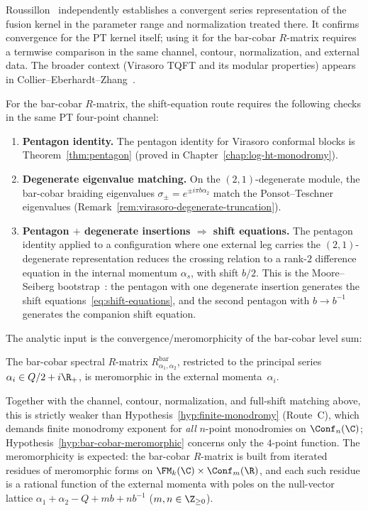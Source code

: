 Roussillon~\cite{Roussillon24} independently establishes a
convergent series representation of the fusion kernel in the parameter
range and normalization treated there. It confirms convergence for the
PT kernel itself; using it for the bar-cobar $R$-matrix requires a
termwise comparison in the same channel, contour, normalization, and
external data. The broader context (Virasoro TQFT and its modular
properties) appears in Collier--Eberhardt--Zhang~\cite{CEZ23}.

For the bar-cobar $R$-matrix, the shift-equation route requires the
following checks in the same PT four-point channel:
\begin{enumerate}[label=\textup{(\roman*)}]
\item \textbf{Pentagon identity.}
 The pentagon identity for Virasoro conformal blocks is
 Theorem~\ref{thm:pentagon} (proved in
 Chapter~\ref{chap:log-ht-monodromy}).

\item \textbf{Degenerate eigenvalue matching.}
 On the $(2,1)$-degenerate module, the bar-cobar braiding
 eigenvalues $\sigma_\pm = e^{\pm i\pi b\alpha_2}$ match the
 Ponsot--Teschner eigenvalues
 (Remark~\ref{rem:virasoro-degenerate-truncation}).

\item \textbf{Pentagon $+$ degenerate insertions $\Rightarrow$
 shift equations.}
 The pentagon identity applied to a configuration where one
 external leg carries the $(2,1)$-degenerate representation
 reduces the crossing relation to a rank-$2$ difference equation
 in the internal momentum $\alpha_s$, with shift $b/2$.
 This is the Moore--Seiberg
 bootstrap~\cite{MooreSeiberg89}: the pentagon with one
 degenerate insertion generates the shift
 equations~\eqref{eq:shift-equations}, and the second pentagon
 with $b \to b^{-1}$ generates the companion shift equation.
\end{enumerate}

The analytic input is the convergence/meromorphicity of the bar-cobar
level sum:

\begin{hypothesis}
\label{hyp:bar-cobar-meromorphic}
The bar-cobar spectral $R$-matrix
$R_{\alpha_1,\alpha_2}^{\mathrm{bar}}$, restricted to the
principal series $\alpha_i \in Q/2 + i\R_+$, is meromorphic in
the external momenta~$\alpha_i$.
\end{hypothesis}

Together with the channel, contour, normalization, and full-shift
matching above, this is strictly weaker than
Hypothesis~\ref{hyp:finite-monodromy} (Route~C), which demands
finite monodromy exponent for \emph{all} $n$-point monodromies on
$\Conf_n(\C)$; Hypothesis~\ref{hyp:bar-cobar-meromorphic} concerns
only the $4$-point function. The meromorphicity is expected: the
bar-cobar $R$-matrix is built from iterated residues of meromorphic
forms on $\FM_k(\C) \times \Conf_m(\R)$, and each such residue
is a rational function of the external momenta with poles on the
null-vector lattice $\alpha_1 + \alpha_2 - Q + mb + nb^{-1}$
($m, n \in \Z_{\ge 0}$).

